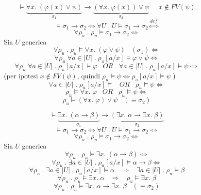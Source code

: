 \documentclass{article}
\theoremstyle{break}
\theoremstyle{break}
\theoremstyle{break}
\theoremstyle{break}
\begin{document}
  \begin{figure}[H]
    \begin{exercise}
      \[
        \models \underbrace{\forall x.\; (\varphi(x) \vee \psi )}_{\sigma_1} \to \underbrace{(\forall x.\; \varphi(x)) \vee \psi}_{\sigma_2} \;\;\;\;\; x \notin FV(\psi )
      \] 
      \[
        \models \sigma_1 \to \sigma_2 \Leftrightarrow \forall U \;.\; U \models \sigma_1 \to \sigma_2 \stackrel{def}{\Leftrightarrow}
      \] 
      \[
        \forall \rho_u \;.\; \rho_u \models \sigma_1 \to \sigma_2 \Leftrightarrow
      \] 
      Sia \( U \) generica
      \[
        \forall \rho_u \;.\; \rho_u \models \forall x.\; (\varphi \vee \psi) \;\;\; (\sigma_1) \Leftrightarrow
      \] 
      \[
        \forall \rho_u \;\forall a \in |U| \;.\; \rho_u [a/x] \models \varphi \vee \psi \Leftrightarrow
      \] 
      \[
        \forall \rho_u\; \forall a \in |U| \;.\; \rho_u [a/x] \models \varphi \;\;\;OR\;\;\; \forall a \in |U| \;.\; \rho_u [a/x] \models \psi \Leftrightarrow
      \] 
      (per ipotesi \( x \notin FV(\psi ) \), quindi \( \rho_u \models \psi \Leftrightarrow \rho_u [a/x] \models \psi  \) )
      \[
        \forall a \in |U| \;.\; \rho_u [a/x] \models \;\;\;OR\;\;\; \rho_u \models \psi \Leftrightarrow
      \] 
      \[
        \rho_u \models \forall x.\; \varphi \;\;\;OR\;\;\; \rho_u \models \psi \Leftrightarrow 
      \] 
      \[
        \rho_u \models (\forall x.\; \varphi ) \vee \psi \;\;\; (\equiv \sigma_2)
      \] 
    \end{exercise}
  \end{figure}

  \begin{figure}[H]
    \begin{exercise}
      \[
        \models \underbrace{\exists x.\; (\alpha \to \beta)}_{\sigma_1} \to \underbrace{(\exists x.\; \alpha \to \exists x.\; \beta)}_{\sigma_2}
      \] 
      \[
        \models \sigma_1 \to \sigma_2 \Leftrightarrow \forall U \;.\; U \models \sigma_1 \to \sigma_2 \Leftrightarrow
      \] 
      \[
        \forall \rho_u \;.\; \rho_u \models \sigma_1 \to \sigma_2 \Leftrightarrow
      \] 
      Sia \( U \) generica
      \[
        \forall \rho_u \;.\; \rho_u \models \exists x.\; (\alpha \to  \beta) \Leftrightarrow
      \] 
      \[
        \forall \rho_u \;.\; \exists a \in |U| \;.\; \rho_u[a/x] \models \alpha \to \beta \Leftrightarrow
      \] 
      \[
        \forall \rho_u \;.\; \exists a \in |U| \;.\; \rho_u[a/x] \models \alpha \;\;\; \Rightarrow \;\;\; \exists a \in |U| \;.\; \rho_u \models \beta
      \] 
      \[
        \forall \rho_u \;.\; \rho_u \models \exists x.\; \alpha \;\;\; \Rightarrow \;\;\; \rho_u \models \exists x.\; \beta
      \] 
      \[
        \forall \rho_u \;.\; \rho_u \models \exists x.\; \alpha \to \exists x.\; \beta \;\;\; (\equiv \sigma_2)
      \] 
    \end{exercise}
  \end{figure}
\end{document}
